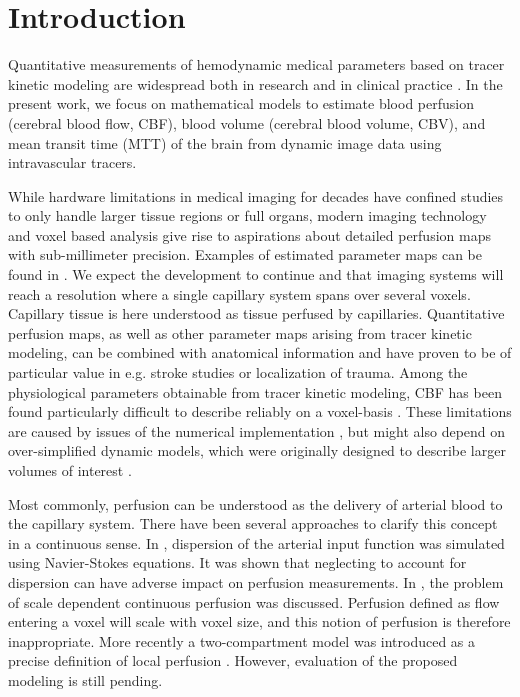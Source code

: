 \documentclass[journal,twocolumn]{IEEEtran}
\begin{document}
	\section{Introduction}

	Quantitative measurements of hemodynamic medical parameters based on tracer kinetic modeling are widespread both in research and in clinical practice \cite{sourbron13,Feng2013,Chen2011}. 
	In the present work, we focus on mathematical models to estimate blood perfusion (cerebral blood flow, CBF), blood volume (cerebral blood volume, CBV), and mean transit time (MTT) of the brain from dynamic image data using intravascular tracers. 

	While hardware limitations in medical imaging for decades have confined studies to only handle larger tissue regions or full organs, modern imaging technology and voxel based analysis give rise to aspirations about detailed perfusion maps with sub-millimeter precision. Examples of estimated parameter maps can be found in \cite{Feng2013,Chen2011}. We expect the development to continue and that imaging systems will reach a resolution where a single capillary system spans over several voxels. Capillary tissue is here understood as tissue perfused by capillaries.
	Quantitative perfusion maps, as well as other parameter maps arising from tracer kinetic modeling, can be combined with anatomical information and have proven to be of particular value in e.g. stroke studies or localization of trauma.
	Among the physiological parameters obtainable from tracer kinetic modeling, CBF has been found particularly difficult to describe reliably on a voxel-basis \cite{kudo10}.
	These limitations are caused by issues of the numerical implementation \cite{kudo10}, but might also depend on over-simplified dynamic models, which were originally designed to describe larger volumes of interest \cite{zierler00}.	

	Most commonly, perfusion can be understood as the delivery of arterial blood to the capillary system.
	There have been several approaches to clarify this concept in a continuous sense.
	In \cite{calamante03}, dispersion of the arterial input function was simulated using Navier-Stokes equations.
	It was shown that neglecting to account for dispersion can have adverse impact on perfusion measurements.
	In \cite{Henkelman1990}, the problem of scale dependent continuous perfusion was discussed. Perfusion defined as flow entering a voxel will scale with voxel size, 
	and this notion of perfusion is therefore inappropriate.	
	More recently a two-compartment model was introduced as a precise definition of local perfusion \cite{sourbron14}.	
	However, evaluation of the proposed modeling is still pending.
\end{document}
